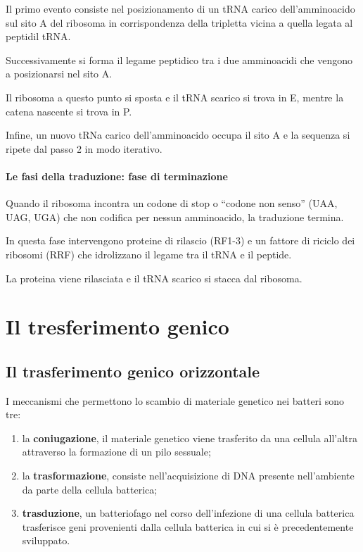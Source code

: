 \documentclass[11pt]{book}
\begin{document}
Il primo evento consiste nel posizionamento di un tRNA carico dell’amminoacido sul sito A del ribosoma in corrispondenza della tripletta vicina a quella legata al peptidil tRNA.

Successivamente si forma il legame peptidico tra i due amminoacidi che vengono a posizionarsi nel sito A.

Il ribosoma a questo punto si sposta e il tRNA scarico si trova in E, mentre la catena nascente si trova in P.

Infine, un nuovo tRNa carico dell’amminoacido occupa il sito A e la sequenza si ripete dal passo 2 in modo iterativo.

\subsubsection{Le fasi della traduzione: fase di terminazione}
Quando il ribosoma incontra un codone di stop o ``codone non senso'' (UAA, UAG, UGA) che non codifica per nessun amminoacido, la traduzione termina. 

In questa fase intervengono proteine di rilascio (RF1-3) e un fattore di riciclo dei ribosomi (RRF) che idrolizzano il legame tra il tRNA e il peptide. 

La proteina viene rilasciata e il tRNA scarico si stacca dal ribosoma.

\chapter{Il tresferimento genico}
\section{Il trasferimento genico orizzontale}

I meccanismi che permettono lo scambio di materiale genetico nei batteri sono tre:
\begin{enumerate}
\item la \textbf{coniugazione}, il materiale genetico viene trasferito da una cellula all’altra attraverso la formazione di un pilo sessuale;
\item la \textbf{trasformazione}, consiste nell'acquisizione di DNA presente nell'ambiente da parte della cellula batterica;
\item \textbf{trasduzione}, un batteriofago nel corso dell’infezione di una cellula batterica trasferisce geni provenienti dalla cellula batterica in cui si è precedentemente sviluppato.
\end{enumerate}
\end{document}
